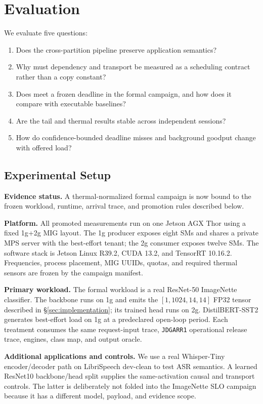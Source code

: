\section{Evaluation}
\label{sec:evaluation}

We evaluate five questions:
\begin{enumerate}[leftmargin=*,itemsep=0pt,topsep=2pt,label=\textbf{Q\arabic*:}]
  \item Does the cross-partition pipeline preserve application semantics?
  \item Why must dependency and transport be measured as a scheduling
  contract rather than a copy constant?
  \item Does \sys meet a frozen deadline in the formal campaign, and how does
  it compare with executable baselines?
  \item Are the tail and thermal results stable across independent sessions?
  \item How do confidence-bounded deadline misses and background goodput
  change with offered load?
\end{enumerate}

\subsection{Experimental Setup}

\textbf{Evidence status.}
A thermal-normalized formal campaign is now bound to the frozen workload,
runtime, arrival trace, and promotion rules described below.

\textbf{Platform.}
All promoted measurements run on one Jetson AGX Thor using a fixed 1g+2g MIG
layout.  The 1g producer exposes eight SMs and shares a private MPS server with
the best-effort tenant; the 2g consumer exposes twelve SMs.  The software stack
is Jetson Linux R39.2, CUDA 13.2, and TensorRT 10.16.2.  Frequencies, process
placement, MIG UUIDs, quotas, and required thermal sensors are frozen by the
campaign manifest.

\textbf{Primary workload.}
The formal workload is a real ResNet-50 ImageNette classifier.  The backbone
runs on 1g and emits the $[1,1024,14,14]$ FP32 tensor described in
\S\ref{sec:implementation}; its trained head runs on 2g.  DistilBERT-SST2
generates best-effort load on 1g at a predeclared open-loop period.  Each
treatment consumes the same request-input trace, \texttt{JDGARR1} operational
release trace, engines, class map, and output oracle.

\textbf{Additional applications and controls.}
We use a real Whisper-Tiny encoder/decoder path on LibriSpeech dev-clean to
test ASR semantics.  A learned ResNet10 backbone/head split supplies the
same-activation causal and transport controls.  The latter is deliberately
not folded into the ImageNette SLO campaign because it has a different model,
payload, and evidence scope.

